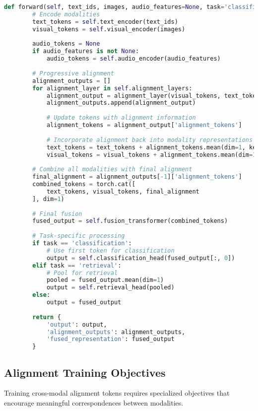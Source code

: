 \begin{lstlisting}[language=Python, caption=Cross-modal alignment architecture]
    def forward(self, text_ids, images, audio_features=None, task='classification'):
        # Encode modalities
        text_tokens = self.text_encoder(text_ids)
        visual_tokens = self.visual_encoder(images)
        
        audio_tokens = None
        if audio_features is not None:
            audio_tokens = self.audio_encoder(audio_features)
        
        # Progressive alignment
        alignment_outputs = []
        for alignment_layer in self.alignment_layers:
            alignment_output = alignment_layer(visual_tokens, text_tokens, audio_tokens)
            alignment_outputs.append(alignment_output)
            
            # Update tokens with alignment information
            alignment_tokens = alignment_output['alignment_tokens']
            
            # Incorporate alignment back into modality representations
            text_tokens = text_tokens + alignment_tokens.mean(dim=1, keepdim=True)
            visual_tokens = visual_tokens + alignment_tokens.mean(dim=1, keepdim=True)
        
        # Combine all modalities with final alignment
        final_alignment = alignment_outputs[-1]['alignment_tokens']
        combined_tokens = torch.cat([
            text_tokens, visual_tokens, final_alignment
        ], dim=1)
        
        # Final fusion
        fused_output = self.fusion_transformer(combined_tokens)
        
        # Task-specific processing
        if task == 'classification':
            # Use first token for classification
            output = self.classification_head(fused_output[:, 0])
        elif task == 'retrieval':
            # Pool for retrieval
            pooled = fused_output.mean(dim=1)
            output = self.retrieval_head(pooled)
        else:
            output = fused_output
        
        return {
            'output': output,
            'alignment_outputs': alignment_outputs,
            'fused_representation': fused_output
        }
\end{lstlisting}

\subsection{Alignment Training Objectives}

Training cross-modal alignment tokens requires specialized objectives that encourage meaningful correspondences between modalities.

